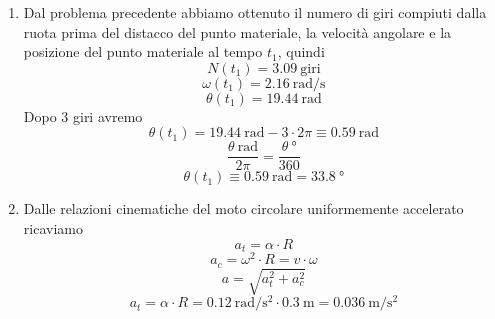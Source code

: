 \documentclass{article}
\begin{document}
\begin{enumerate}[label=\alph*)]
    \item Dal problema precedente abbiamo ottenuto il numero di giri compiuti dalla ruota prima del distacco del punto materiale, la velocità angolare e la posizione del punto materiale al tempo $t_1$, quindi
          \begin{equation*}
              N(t_1) = \SI{3.09}{\text{giri}}
          \end{equation*}
          \begin{equation*}
              \omega(t_1) = \SI{2.16}{\radian\per\second}
          \end{equation*}
          \begin{equation*}
              \theta(t_1) = \SI{19.44}{\radian}
          \end{equation*}
          Dopo 3 giri avremo
          \begin{equation*}
              \theta(t_1) = \SI{19.44}{\radian} - 3 \cdot 2 \pi \equiv \SI{0.59}{\radian}
          \end{equation*}
          \begin{equation*}
              \boxed{\displaystyle \frac{\theta \SI{}{\radian}}{2\pi} = \frac{\theta \SI{}{\degree}}{360}}
          \end{equation*}
          \begin{equation*}
              \theta(t_1) \equiv \SI{0.59}{\radian} = \SI{33.8}{\degree}
          \end{equation*}
    \item Dalle relazioni cinematiche del moto circolare uniformemente accelerato ricaviamo
          \begin{equation*}
              \boxed{a_t = \alpha \cdot R}
          \end{equation*}
          \begin{equation*}
              \boxed{a_c = \omega^2 \cdot R = v \cdot \omega }
          \end{equation*}
          \begin{equation*}
              \boxed{a = \sqrt{a_t^2 + a_c^2}}
          \end{equation*}
          \begin{equation*}
              a_t = \alpha \cdot R = \SI{0.12}{\radian\per\second\squared} \cdot \SI{0.3}{\meter} = \SI{0.036}{\meter\per\second\squared}
          \end{equation*}
          \begin{equation*}

\end{equation*}
\end{enumerate}
\end{document}
